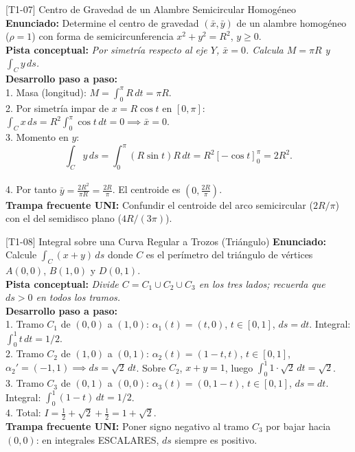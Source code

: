 \documentclass[11pt,a4paper]{article}
\begin{document}
\begin{ejerciciobox}{[T1-07] Centro de Gravedad de un Alambre Semicircular Homogéneo}
\textbf{Enunciado:} Determine el centro de gravedad $(\bar{x}, \bar{y})$ de un alambre homogéneo ($\rho = 1$) con forma de semicircunferencia $x^2 + y^2 = R^2$, $y \ge 0$.\\[0.2cm]
\textbf{Pista conceptual:} \emph{Por simetría respecto al eje $Y$, $\bar{x} = 0$. Calcula $M = \pi R$ y $\int_C y\,ds$.}\\[0.2cm]
\textbf{Desarrollo paso a paso:}\\
1. Masa (longitud): $M = \int_0^\pi R\,dt = \pi R$.\\
2. Por simetría impar de $x = R\cos t$ en $[0,\pi]$: $\int_C x\,ds = R^2\int_0^\pi \cos t\,dt = 0 \implies \bar{x} = 0$.\\
3. Momento en $y$:\\
$$\int_C y\,ds = \int_0^\pi (R\sin t)R\,dt = R^2[-\cos t]_0^\pi = 2R^2.$$\\
4. Por tanto $\bar{y} = \frac{2R^2}{\pi R} = \frac{2R}{\pi}$. El centroide es $\left(0, \frac{2R}{\pi}\right)$.\\[0.2cm]
\textbf{Trampa frecuente UNI:} Confundir el centroide del arco semicircular ($2R/\pi$) con el del semidisco plano ($4R/(3\pi)$).
\end{ejerciciobox}

\begin{ejerciciobox}{[T1-08] Integral sobre una Curva Regular a Trozos (Triángulo)}
\textbf{Enunciado:} Calcule $\int_C (x + y)\,ds$ donde $C$ es el perímetro del triángulo de vértices $A(0,0)$, $B(1,0)$ y $D(0,1)$.\\[0.2cm]
\textbf{Pista conceptual:} \emph{Divide $C = C_1 \cup C_2 \cup C_3$ en los tres lados; recuerda que $ds > 0$ en todos los tramos.}\\[0.2cm]
\textbf{Desarrollo paso a paso:}\\
1. Tramo $C_1$ de $(0,0)$ a $(1,0)$: $\alpha_1(t)=(t,0)$, $t\in[0,1]$, $ds=dt$. Integral: $\int_0^1 t\,dt = 1/2$.\\
2. Tramo $C_2$ de $(1,0)$ a $(0,1)$: $\alpha_2(t)=(1-t, t)$, $t\in[0,1]$, $\alpha_2'=(-1,1) \implies ds=\sqrt{2}\,dt$. Sobre $C_2$, $x+y=1$, luego $\int_0^1 1\cdot\sqrt{2}\,dt = \sqrt{2}$.\\
3. Tramo $C_3$ de $(0,1)$ a $(0,0)$: $\alpha_3(t)=(0, 1-t)$, $t\in[0,1]$, $ds=dt$. Integral: $\int_0^1 (1-t)\,dt = 1/2$.\\
4. Total: $I = \frac{1}{2} + \sqrt{2} + \frac{1}{2} = 1 + \sqrt{2}$.\\[0.2cm]
\textbf{Trampa frecuente UNI:} Poner signo negativo al tramo $C_3$ por bajar hacia $(0,0)$: en integrales ESCALARES, $ds$ siempre es positivo.
\end{ejerciciobox}
\end{document}
